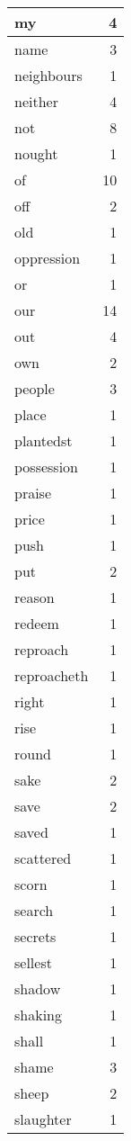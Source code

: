 \begin{center}
\begin{longtable}{l|r}
my & 4 \\ \hline
name & 3 \\ \hline
neighbours & 1 \\ \hline
neither & 4 \\ \hline
not & 8 \\ \hline
nought & 1 \\ \hline
of & 10 \\ \hline
off & 2 \\ \hline
old & 1 \\ \hline
oppression & 1 \\ \hline
or & 1 \\ \hline
our & 14 \\ \hline
out & 4 \\ \hline
own & 2 \\ \hline
people & 3 \\ \hline
place & 1 \\ \hline
plantedst & 1 \\ \hline
possession & 1 \\ \hline
praise & 1 \\ \hline
price & 1 \\ \hline
push & 1 \\ \hline
put & 2 \\ \hline
reason & 1 \\ \hline
redeem & 1 \\ \hline
reproach & 1 \\ \hline
reproacheth & 1 \\ \hline
right & 1 \\ \hline
rise & 1 \\ \hline
round & 1 \\ \hline
sake & 2 \\ \hline
save & 2 \\ \hline
saved & 1 \\ \hline
scattered & 1 \\ \hline
scorn & 1 \\ \hline
search & 1 \\ \hline
secrets & 1 \\ \hline
sellest & 1 \\ \hline
shadow & 1 \\ \hline
shaking & 1 \\ \hline
shall & 1 \\ \hline
shame & 3 \\ \hline
sheep & 2 \\ \hline
slaughter & 1 \\ \hline

\end{longtable}
\end{center}
